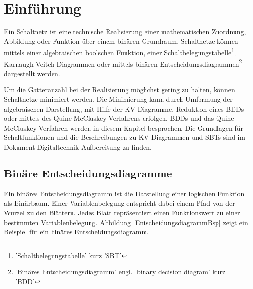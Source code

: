 \chapter{Einführung}
Ein Schaltnetz ist eine technische Realisierung einer mathematischen Zuordnung, Abbildung oder Funktion über einem binären Grundraum. Schaltnetze können mittels einer algebraischen boolschen Funktion, einer Schaltbelegungstabelle\footnote{'Schaltbelegungstabelle' kurz 'SBT'}, Karnaugh-Veitch Diagrammen oder mittels binären Entscheidungsdiagrammen\footnote{'Binäres Entscheidungsdiagramm' engl. 'binary decision diagram' kurz 'BDD'} dargestellt werden.

Um die Gatteranzahl bei der Realisierung möglichst gering zu halten, können Schaltnetze minimiert werden. Die Minimierung kann durch Umformung der algebraischen Darstellung, mit Hilfe der KV-Diagramme, Reduktion eines BDDs oder mittels des Quine-McCluskey-Verfahrens erfolgen. BDDs und das Quine-McCluskey-Verfahren werden in diesem Kapitel besprochen. Die Grundlagen für Schaltfunktionen und die Beschreibungen zu KV-Diagrammen und SBTs sind im Dokument Digitaltechnik Aufbereitung zu finden. 

\section{Binäre Entscheidungsdiagramme}
Ein binäres Entscheidungsdiagramm ist die Darstellung einer logischen Funktion als Binärbaum. Einer Variablenbelegung entspricht dabei einem Pfad von der Wurzel zu den Blättern. Jedes Blatt repräsentiert einen Funktionswert zu einer bestimmten Variablenbelegung. Abbildung \ref{EntscheidungsdiagrammBsp} zeigt ein Beispiel für ein binäres Entscheidungsdiagramm.


